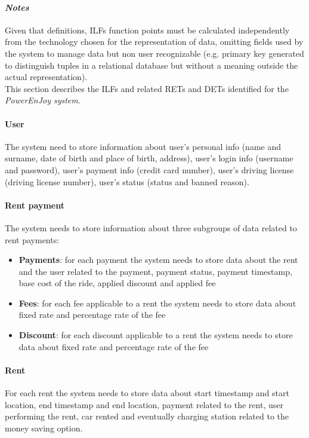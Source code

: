 \paragraph{\emph{Notes}} Given that definitions, ILFs function points must be calculated independently from the technology chosen for the representation of data, omitting fields used by the system to manage data but non user recognizable (e.g. primary key generated to distinguish tuples in a relational database but without a meaning outside the actual representation).\\ 

This section describes the ILFs and related RETs and DETs identified for the \emph{PowerEnJoy system}.

\paragraph{User} The system need to store information about user's personal info (name and surname, date of birth and place of birth, address), user's login info (username and password), user's payment info (credit card number), user's driving license (driving license number), user's status (status and banned reason).

\paragraph{Rent payment} The system needs to store information about three subgroups of data related to rent payments:
\begin{itemize}
	\item \textbf{Payments}: for each payment the system needs to store data about the rent and the user related to the payment, payment status, payment timestamp, base cost of the ride, applied discount and applied fee
	\item \textbf{Fees}: for each fee applicable to a rent the system needs to store data about fixed rate and percentage rate of the fee
	\item \textbf{Discount}: for each discount applicable to a rent the system needs to store data about fixed rate and percentage rate of the fee
\end{itemize}

\paragraph{Rent} For each rent the system needs to store data about start timestamp and start location, end timestamp and end location, payment related to the rent, user performing the rent, car rented and eventually charging station related to the money saving option.

